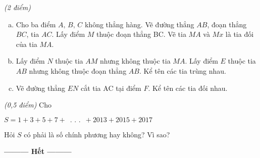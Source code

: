 \begin{ex}
\end{ex}    \begin{ex}  \textit{(2 điểm)}
 \begin{enumerate}[a)]
\item Cho ba điểm $A,\,B,\,C$ không thẳng hàng. Vẽ đường thẳng $AB$, đoạn thẳng $BC$, tia $AC$. Lấy điểm $M$  thuộc đoạn thẳng BC. Vẽ tia $MA$  và $Mx$ là tia đối của tia $MA$.   
\item Lấy điểm $N$ thuộc tia $AM$ nhưng không thuộc tia $MA$. Lấy điểm $E$ thuộc tia $AB$ nhưng không thuộc đoạn thẳng $AB$. Kể tên các tia trùng nhau.
\item Vẽ đường thẳng $EN$ cắt tia  AC  tại điểm $F$. Kể tên các tia đối nhau. 
\end{enumerate}
\end{ex}    \begin{ex} \textit{(0,5 điểm)} Cho 
\begin{center}
$S=1+3+5+7+\,\,\,.\,\,.\,\,.\,\,\,+2013+2015+2017$
\end{center}
Hỏi $S$ có phải là số chính phương hay không? Vì sao? 

\end{ex}
\begin{center}
\textbf{\textbf{---------} Hết \textbf{---------}}
\end{center}